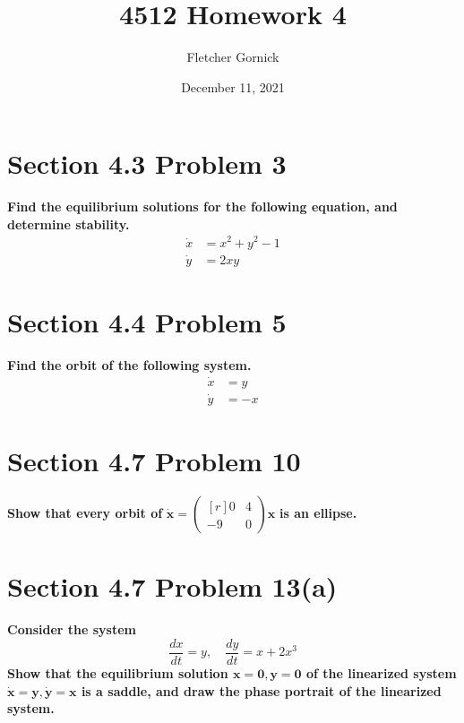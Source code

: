 \documentclass[11pt]{article}
\title{4512 Homework 4}
\author{Fletcher Gornick}
\date{December 11, 2021}
\begin{document}
 \maketitle 
 \section*{Section 4.3 Problem 3}
 \textbf{Find the equilibrium solutions for the following equation, and determine stability.}
 \begin{align*} \dot x &= x^2 + y^2 - 1 \\ \dot y &= 2xy \end{align*}
 \newpage
 \section*{Section 4.4 Problem 5}
 \textbf{Find the orbit of the following system.}
 \begin{align*} \dot x &= y \\ \dot y &= -x \end{align*}
 \newpage
 \section*{Section 4.7 Problem 10}
 \textbf{Show that every orbit of} 
 \(\boldsymbol{\dot x} = \begin{pmatrix*}[r] 0 & 4 \\ -9 & 0 \end{pmatrix*} \boldsymbol{x}\)
 \textbf{is an ellipse.}
 \newpage
 \section*{Section 4.7 Problem 13(a)}
 \textbf{Consider the system}
 \[\frac{dx}{dt} = y, \quad \frac{dy}{dt} = x + 2x^3\]
 \textbf{Show that the equilibrium solution \(\mathbf{x=0,y=0}\) of the linearized system 
 \(\mathbf{\dot x = y, \dot y = x}\) is a saddle, and draw the phase portrait of the linearized 
 system.}
\end{document}
